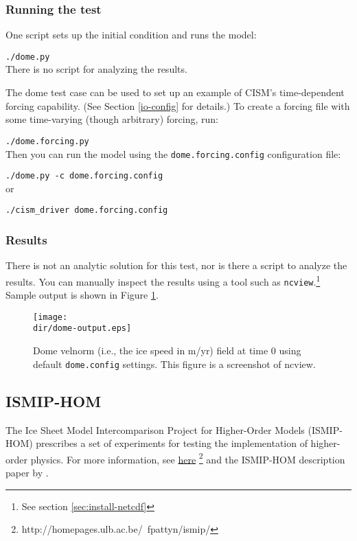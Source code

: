 \subsubsection{Running the test}
One script sets up the initial condition and runs the model:

\texttt{./dome.py}\\

\noindent
There is no script for analyzing the results.

\par
The dome test case can be used to set up an example of CISM's time-dependent
forcing capability.  (See Section \ref{io-config} for details.)
To create a forcing file with some time-varying (though arbitrary) forcing, run:

\texttt{./dome.forcing.py}\\

\noindent
Then you can run the model using the \texttt{dome.forcing.config} configuration file:

\texttt{./dome.py -c dome.forcing.config}\\

\noindent
or

\texttt{./cism\_driver dome.forcing.config}\\

\subsubsection{Results}
There is not an analytic solution for this test, nor is there a script to analyze
the results.  You can manually inspect the results using a tool such as \texttt{ncview}.\footnote{See section \ref{sec:install-netcdf}}
Sample output is shown in Figure \ref{fig:domeresults}.
\begin{figure}[H!]
	\centering
	\texttt{[image: \\dir/dome-output.eps]}
	\caption{Dome velnorm (i.e., the ice speed in m/yr) field at time 0 using default \texttt{dome.config} settings. This figure is a screenshot of ncview.}
	\label{fig:domeresults}
\end{figure}
\FloatBarrier

\subsection{ISMIP-HOM}
The Ice Sheet Model Intercomparison Project for Higher-Order Models (ISMIP-HOM)
prescribes a set of experiments for testing the implementation of higher-order physics.  
For more information, see \href{http://homepages.ulb.ac.be/~fpattyn/ismip/}{here}
\footnote{http://homepages.ulb.ac.be/~fpattyn/ismip/} and the ISMIP-HOM description paper by \citet{Pattyn2008}.

